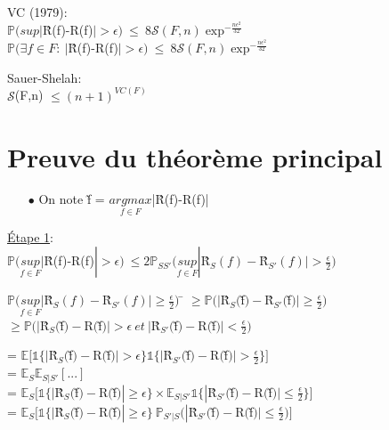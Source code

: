 \documentclass[a4paper]{report}
\begin{document}
\begin{theorem}
VC (1979):\\
$\mathds{P}(sup|$\^R(f)-R(f)$| > \epsilon)\ \leq \ 8\mathcal{S}(F,n) \exp ^{-\frac{n\epsilon^2}{32}}$\\
$\mathds{P}(\exists f \in F:\ |$\^R(f)-R(f)$| > \epsilon)\ \leq \ 8\mathcal{S}(F,n)\exp ^{-\frac{n\epsilon^2}{32}}$\\
\end{theorem}

\begin{lemma}
Sauer-Shelah:\\
$\mathcal{S}$(F,n) $ \leq (n+1)^{VC(F)}$
\end{lemma}

\section{Preuve du théorème principal}
\begin{itemize}
\item[$\bullet$]On note \~f = $\underset{f\in F}{argmax}$|\^R(f)-R(f)|\\
\end{itemize}
\underline{Étape 1}:\\
$\mathds{P}(\underset{f\in F}{sup}|$\^R(f)-R(f)$| > \epsilon)\ \leq 2\mathds{P}_{SS'}(\underset{f\in F}{sup}|$\^R$_S(f)-$\^R$_{S'}(f)| > \frac{\epsilon}{2})$\\
\begin{tabbing}
$\mathds{P}(\underset{f\in F}{sup}|$\^R$_S(f)-$\^R$_{S'}(f)| \geq \frac{\epsilon}{2})$ \= $\geq \mathds{P}(|$\^R$_S($\~f$)-$\^R$_{S'}($\~f$)| \geq \frac{\epsilon}{2})$\\
\> $\geq \mathds{P}(|$\^R$_S($\~f$)-$R$($\~f$)| > \epsilon\ et\ |$\^R$_{S'}($\~f$)-$R$($\~f$)| < \frac{\epsilon}{2})$\\
\end{tabbing}
= $ \mathds{E}[\mathds{1}\{|$\^R$_S($\~f$)-$R$($\~f$)|>\epsilon\}\mathds{1}\{|$\^R$_{S'}($\~f$)-$R$($\~f$)|>\frac{\epsilon}{2}\}] $\\
= $ \mathds{E}_S \mathds{E}_{S|S'}[...] $\\
= $ \mathds{E}_S[\mathds{1}\{|$\^R$_S($\~f$)-$R$($\~f$)|\geq \epsilon\}\times \mathds{E}_{S|S'}\mathds{1}\{|$\^R$_{S'}($\~f$)-$R$($\~f$)|\leq \frac{\epsilon}{2}\}] $\\
= $ \mathds{E}_S[\mathds{1}\{|$\^R$_S($\~f$)-$R$($\~f$)|\geq \epsilon\}\ \mathds{P}_{S'|S}(|$\^R$_{S'}($\~f$)-$R$($\~f$)|\leq \frac{\epsilon}{2})] $\\
\end{document}

